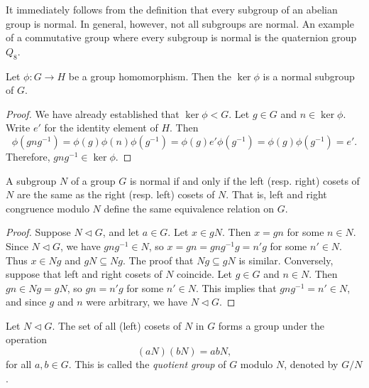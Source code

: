 \begin{example}
    It immediately follows from the definition that every subgroup of an abelian
    group is normal. In general, however, not all subgroups are normal. An
    example of a commutative group where every subgroup is normal is the
    quaternion group \(Q_8\).
\end{example}

\begin{theorem}
    Let \(\phi : G \to H\) be a group homomorphism. Then the \(\ker \phi\) is a
    normal subgroup of \(G\).
\end{theorem}

\begin{proof}
    We have already established that \(\ker \phi < G\). Let \(g \in G\) and \(n
    \in \ker \phi\). Write \(e'\) for the identity element of \(H\). Then
    \[
        \phi(gng^{-1}) = \phi(g)\phi(n)\phi(g^{-1}) = \phi(g)e'\phi(g^{-1}) = \phi(g)\phi(g^{-1}) = e'.
    \]
    Therefore, \(gng^{-1} \in \ker \phi\).
\end{proof}

\begin{theorem}
    A subgroup \(N\) of a group \(G\) is normal if and only if the left (resp.
    right) cosets of \(N\) are the same as the right (resp. left) cosets of
    \(N\). That is, left and right congruence modulo \(N\) define the same
    equivalence relation on \(G\).
\end{theorem}

\begin{proof}
    Suppose \(N \triangleleft G\), and let \(a \in G\). Let \(x \in gN\). Then
    \(x = gn\) for some \(n \in N\). Since \(N \triangleleft G\), we have
    \(gng^{-1} \in N\), so \(x = gn = gng^{-1}g = n'g\) for some \(n' \in N\).
    Thus \(x \in Ng\) and \(gN \subseteq Ng\). The proof that \(Ng \subseteq
    gN\) is similar. Conversely, suppose that left and right cosets of \(N\)
    coincide. Let \(g \in G\) and \(n \in N\). Then \(gn \in Ng = gN\), so \(gn
    = n'g\) for some \(n' \in N\). This implies that \(gng^{-1} = n' \in N\),
    and since \(g\) and \(n\) were arbitrary, we have \(N \triangleleft G\).
\end{proof}

\begin{theorem}
    \label{thm:quotient-group}
    Let \(N \triangleleft G\). The set of all (left) cosets of \(N\) in \(G\)
    forms a group under the operation
    \[
        (aN)(bN) = abN,
    \]
    for all \(a, b \in G\). This is called the \emph{quotient group} of \(G\)
    modulo \(N\), denoted by \(G/N\).
\end{theorem}

